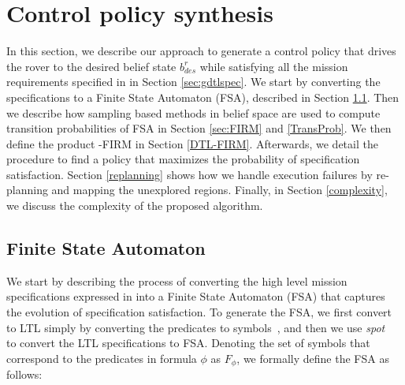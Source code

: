 \documentclass[conference]{IEEEtran}
\begin{document}
	
\section{Control policy synthesis} \label{sec:planner}
In this section, we describe our approach to generate a control policy that drives the rover to the desired belief state $b^r_{des}$ while satisfying all the mission requirements specified in \DTL in Section \ref{sec:gdtlspec}. We start by converting the \DTL specifications to a Finite State Automaton (FSA), described in Section \ref{FSA}. Then we describe how sampling based methods in belief space are used to compute transition probabilities of FSA in Section \ref{sec:FIRM} and \ref{TransProb}. We then define the product \DTL-FIRM in Section \ref{DTL-FIRM}. Afterwards, we detail the procedure to find a policy that maximizes the probability of specification satisfaction. Section \ref{replanning} shows how we handle execution failures by re-planning and mapping the unexplored regions. Finally, in Section \ref{complexity}, we discuss the complexity of the proposed algorithm.


\subsection{Finite State Automaton}\label{FSA}
We start by describing the process of converting the high level mission specifications expressed in \DTL into a Finite State Automaton (FSA) that captures the evolution of specification satisfaction. To generate the FSA, we first convert \DTL to LTL simply by converting the predicates to symbols~\cite{JonesDTL2013}, and then we use {\em spot}~\cite{duret14} to convert the LTL specifications to FSA.
Denoting the set of symbols that correspond to the predicates in \DTL formula $\phi$ as $F_\phi$, we formally define the FSA as follows:
\end{document}
